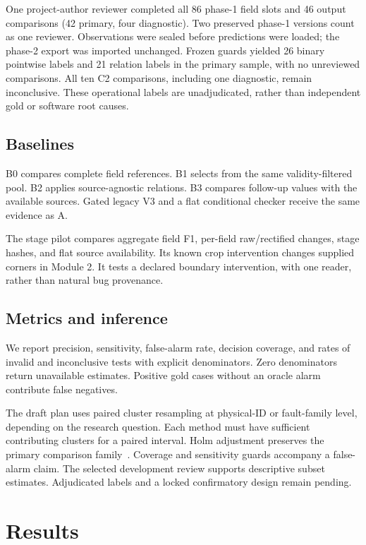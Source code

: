 \documentclass[sigconf,review,anonymous]{acmart}
\begin{document}
One project-author reviewer completed all 86 phase-1 field slots and 46 output comparisons (42 primary, four diagnostic). Two preserved phase-1 versions count as one reviewer. Observations were sealed before predictions were loaded; the phase-2 export was imported unchanged. Frozen guards yielded 26 binary pointwise labels and 21 relation labels in the primary sample, with no unreviewed comparisons. All ten C2 comparisons, including one diagnostic, remain inconclusive. These operational labels are unadjudicated, rather than independent gold or software root causes.

\subsection{Baselines}
B0 compares complete field references. B1 selects from the same validity-filtered pool. B2 applies source-agnostic relations. B3 compares follow-up values with the available sources. Gated legacy V3 and a flat conditional checker receive the same evidence as A.

The stage pilot compares aggregate field F1, per-field raw/rectified changes, stage hashes, and flat source availability. Its known crop intervention changes supplied corners in Module 2. It tests a declared boundary intervention, with one reader, rather than natural bug provenance.

\subsection{Metrics and inference}
We report precision, sensitivity, false-alarm rate, decision coverage, and rates of invalid and inconclusive tests with explicit denominators. Zero denominators return unavailable estimates. Positive gold cases without an oracle alarm contribute false negatives.

The draft plan uses paired cluster resampling at physical-ID or fault-family level, depending on the research question. Each method must have sufficient contributing clusters for a paired interval. Holm adjustment preserves the primary comparison family~\cite{holm1979sequential}. Coverage and sensitivity guards accompany a false-alarm claim. The selected development review supports descriptive subset estimates. Adjudicated labels and a locked confirmatory design remain pending.

\section{Results}
\end{document}
